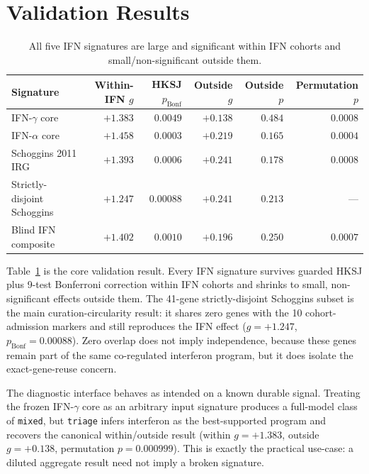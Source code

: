 \documentclass[10pt]{article}
\begin{document}
\section{Validation Results}
\begin{table}[H]
\centering
\footnotesize
\setlength{\tabcolsep}{4pt}
\begin{tabular}{lrrrrr}
\toprule
Signature & Within-IFN $g$ & HKSJ $p_{\mathrm{Bonf}}$ & Outside $g$ & Outside $p$ & Permutation $p$ \\
\midrule
IFN-$\gamma$ core & $+1.383$ & $0.0049$ & $+0.138$ & $0.484$ & $0.0008$ \\
IFN-$\alpha$ core & $+1.458$ & $0.0003$ & $+0.219$ & $0.165$ & $0.0004$ \\
Schoggins 2011 IRG & $+1.393$ & $0.0006$ & $+0.241$ & $0.178$ & $0.0008$ \\
Strictly-disjoint Schoggins & $+1.247$ & $0.00088$ & $+0.241$ & $0.213$ & --- \\
Blind IFN composite & $+1.402$ & $0.0010$ & $+0.196$ & $0.250$ & $0.0007$ \\
\bottomrule
\end{tabular}
\caption{All five IFN signatures are large and significant within IFN cohorts and small/non-significant outside them.}
\label{tab:primary}
\end{table}

Table~\ref{tab:primary} is the core validation result. Every IFN signature survives guarded HKSJ plus 9-test Bonferroni correction within IFN cohorts and shrinks to small, non-significant effects outside them. The 41-gene strictly-disjoint Schoggins subset is the main curation-circularity result: it shares zero genes with the 10 cohort-admission markers and still reproduces the IFN effect ($g=+1.247$, $p_{\mathrm{Bonf}}=0.00088$). Zero overlap does not imply independence, because these genes remain part of the same co-regulated interferon program, but it does isolate the exact-gene-reuse concern.

The diagnostic interface behaves as intended on a known durable signal. Treating the frozen IFN-$\gamma$ core as an arbitrary input signature produces a full-model class of \texttt{mixed}, but \texttt{triage} infers interferon as the best-supported program and recovers the canonical within/outside result (within $g=+1.383$, outside $g=+0.138$, permutation $p=0.000999$). This is exactly the practical use-case: a diluted aggregate result need not imply a broken signature.
\end{document}
